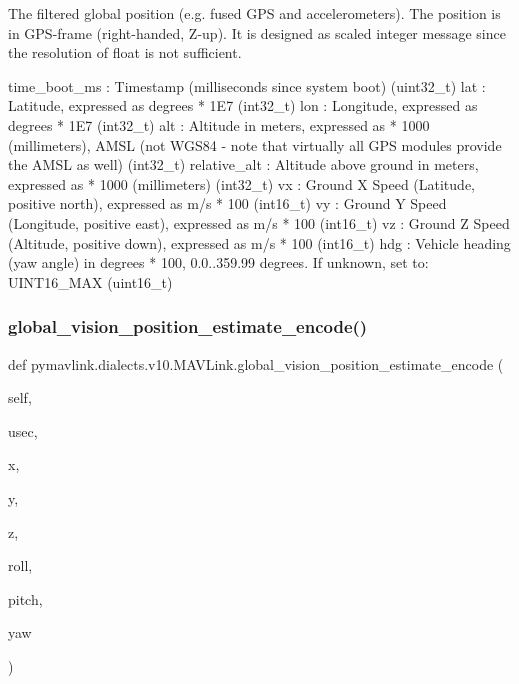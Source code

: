 \begin{DoxyVerb}
\begin{DoxyVerb}
\begin{DoxyVerb}The filtered global position (e.g. fused GPS and accelerometers). The
position is in GPS-frame (right-handed, Z-up). It
is designed as scaled integer message since the
resolution of float is not sufficient.

time_boot_ms              : Timestamp (milliseconds since system boot) (uint32_t)
lat                       : Latitude, expressed as degrees * 1E7 (int32_t)
lon                       : Longitude, expressed as degrees * 1E7 (int32_t)
alt                       : Altitude in meters, expressed as * 1000 (millimeters), AMSL (not WGS84 - note that virtually all GPS modules provide the AMSL as well) (int32_t)
relative_alt              : Altitude above ground in meters, expressed as * 1000 (millimeters) (int32_t)
vx                        : Ground X Speed (Latitude, positive north), expressed as m/s * 100 (int16_t)
vy                        : Ground Y Speed (Longitude, positive east), expressed as m/s * 100 (int16_t)
vz                        : Ground Z Speed (Altitude, positive down), expressed as m/s * 100 (int16_t)
hdg                       : Vehicle heading (yaw angle) in degrees * 100, 0.0..359.99 degrees. If unknown, set to: UINT16_MAX (uint16_t)\end{DoxyVerb}
 \mbox{\label{classpymavlink_1_1dialects_1_1v10_1_1MAVLink_aa27de0d3a7a08f9b6411b506ccdbb7dd}} 
\subsubsection{\texorpdfstring{global\+\_\+vision\+\_\+position\+\_\+estimate\+\_\+encode()}{global\_vision\_position\_estimate\_encode()}}
{\footnotesize\ttfamily def pymavlink.\+dialects.\+v10.\+M\+A\+V\+Link.\+global\+\_\+vision\+\_\+position\+\_\+estimate\+\_\+encode (\begin{DoxyParamCaption}\item[{}]{self,  }\item[{}]{usec,  }\item[{}]{x,  }\item[{}]{y,  }\item[{}]{z,  }\item[{}]{roll,  }\item[{}]{pitch,  }\item[{}]{yaw }\end{DoxyParamCaption})}


\end{DoxyVerb}
\end{DoxyVerb}
